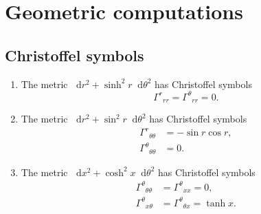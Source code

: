 \documentclass[reqno,11pt]{amsart}
\newcommand*\dif{\mathop{}\!\mathrm{d}}
\theoremstyle{definition}
\numberwithin{equation}{section}
\begin{document}
\appendix 
\section{Geometric computations}
\subsection{Christoffel symbols}
\begin{enumerate}
\item The metric $\dif r^2 + \sinh^2 r \dif \theta^2$ has Christoffel symbols
\begin{equation}\label{hyperbolic polar} 
{\Gamma^r}_{rr} = {\Gamma^\theta}_{rr} = 0.
\end{equation}
\item The metric $\dif r^2 + \sin^2 r \dif \theta^2$ has Christoffel symbols
\begin{align}
{\Gamma^r}_{\theta \theta} &= -\sin r \cos r, \label{sphere polar 1} \\
{\Gamma^\theta}_{\theta \theta} &= 0. \label{sphere polar 2}
\end{align}
\item The metric $\dif x^2 + \cosh^2 x \dif \theta^2$ has Christoffel symbols 
\begin{align}
{\Gamma^\theta}_{\theta \theta} &= {\Gamma^\theta}_{x x} = 0, \label{hyperbolic cylinder 1} \\
{\Gamma^\theta}_{x \theta} &= {\Gamma^\theta}_{\theta x} = \tanh x. \label{hyperbolic cylinder 2}
\end{align}
\end{enumerate}


\printbibliography
\end{document}
